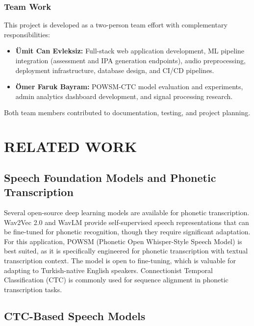 \documentclass[a4paper,12pt]{report}
\begin{document}
\subsection{Team Work}
This project is developed as a two-person team effort with complementary responsibilities:

\begin{itemize}
    \item \textbf{Ümit Can Evleksiz:} Full-stack web application development, ML pipeline integration (assessment and IPA generation endpoints), audio preprocessing, deployment infrastructure, database design, and CI/CD pipelines.
    \item \textbf{Ömer Faruk Bayram:} POWSM-CTC model evaluation and experiments, admin analytics dashboard development, and signal processing research.
\end{itemize}

Both team members contributed to documentation, testing, and project planning.

\chapter{RELATED WORK}

\section{Speech Foundation Models and Phonetic Transcription}

Several open-source deep learning models are available for phonetic transcription. Wav2Vec 2.0 \cite{baevski2020wav2vec} and WavLM \cite{chen2022wavlm} provide self-supervised speech representations that can be fine-tuned for phonetic recognition, though they require significant adaptation. For this application, POWSM (Phonetic Open Whisper-Style Speech Model) \cite{powsm} is best suited, as it is specifically engineered for phonetic transcription with textual transcription context. The model is open to fine-tuning, which is valuable for adapting to Turkish-native English speakers. Connectionist Temporal Classification (CTC) \cite{graves2006connectionist} is commonly used for sequence alignment in phonetic transcription tasks.

\section{CTC-Based Speech Models}
\end{document}
